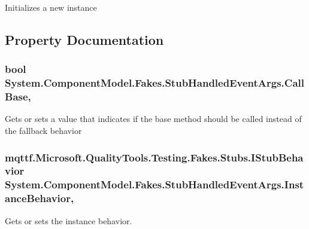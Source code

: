 Initializes a new instance



\subsection{Property Documentation}
\hypertarget{class_system_1_1_component_model_1_1_fakes_1_1_stub_handled_event_args_a5c6c957027a35ae696dae942d2612359}{
\subsubsection[{Call\-Base}]{\setlength{\rightskip}{0pt plus 5cm}bool System.\-Component\-Model.\-Fakes.\-Stub\-Handled\-Event\-Args.\-Call\-Base\hspace{0.3cm}{\ttfamily [get]}, {\ttfamily [set]}}}\label{class_system_1_1_component_model_1_1_fakes_1_1_stub_handled_event_args_a5c6c957027a35ae696dae942d2612359}


Gets or sets a value that indicates if the base method should be called instead of the fallback behavior

\hypertarget{class_system_1_1_component_model_1_1_fakes_1_1_stub_handled_event_args_aebe2e0a6f64bfe938a641f7c8b28bac1}{
\subsubsection[{Instance\-Behavior}]{\setlength{\rightskip}{0pt plus 5cm}mqttf.\-Microsoft.\-Quality\-Tools.\-Testing.\-Fakes.\-Stubs.\-I\-Stub\-Behavior System.\-Component\-Model.\-Fakes.\-Stub\-Handled\-Event\-Args.\-Instance\-Behavior\hspace{0.3cm}{\ttfamily [get]}, {\ttfamily [set]}}}\label{class_system_1_1_component_model_1_1_fakes_1_1_stub_handled_event_args_aebe2e0a6f64bfe938a641f7c8b28bac1}


Gets or sets the instance behavior.

